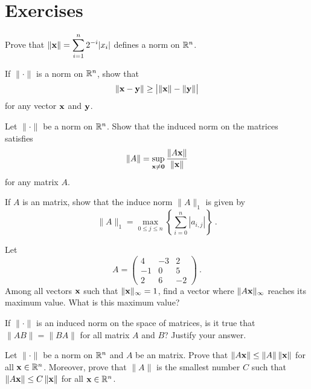 \section{Exercises}

\begin{question}
Prove that $\displaystyle \|\mathbf{x}\| = \sum_{i=1}^n 2^{-i}|x_i|$
defines a norm on $\mathbb{R}^n$.
\label{solvBQ1}
\end{question}

\begin{question}
If $\|\cdot\|$ is a norm on $\mathbb{R}^n$, show that
\begin{equation}\label{triminus}
\|\mathbf{x}-\mathbf{y}\| \geq \big| \|\mathbf{x}\|-\|\mathbf{y}\| \big|
\end{equation}
for any vector $\mathbf{x}$ and $\mathbf{y}$.
\label{solvBQ2}
\end{question}

\begin{question}
Let $\|\cdot\|$ be a norm on $\mathbb{R}^n$.  Show that the induced norm on
the \nn matrices satisfies
\[
\|A\| = \sup_{\mathbf{x}\neq\mathbf{0}} \frac{\|A\mathbf{x}\|}{\|\mathbf{x}\|}
\]
for any \nn matrix $A$.
\label{solvBQ3}
\end{question}

\begin{question}
If $A$ is an \nn matrix, show that the induce norm $\|A\|_1$ is given by
\[
\| A \|_1 = \max_{0\leq j \leq n} \left\{ \sum_{i=0}^n |a_{i,j}| \right\} \ .
\]
\label{solvBQ4}
\end{question}

\begin{question}
Let
\[
A = \begin{pmatrix}
4 & -3 & 2 \\ -1 & 0 & 5 \\ 2 & 6 & -2
\end{pmatrix} \ .
\]
Among all vectors $\mathbf{x}$ such that $\|\mathbf{x}\|_\infty = 1$, find a
vector where $\|A\mathbf{x}\|_\infty$ reaches its maximum value.
What is this maximum value?
\label{solvBQ5}
\end{question}

\begin{question}
If $\|\cdot\|$ is an induced norm on the space of \nn matrices, is it
true that $\|AB\| = \|BA\|$ for all matrix $A$ and $B$?  Justify your
answer.
\label{solvBQ6}
\end{question}

\begin{question}
Let $\|\cdot\|$ be a norm on $\mathbb{R}^n$ and $A$ be an \nn matrix.
Prove that $\|A\mathbf{x} \| \leq \|A\| \, \|\mathbf{x}\|$ for all
$\mathbf{x} \in \mathbb{R}^n$.  Moreover, prove that $\|A\|$ is the smallest
number $C$ such that $\|A\mathbf{x} \| \leq C \, \|\mathbf{x}\|$ for all
$\mathbf{x} \in \mathbb{R}^n$.
\label{solvBQ7}
\end{question}

